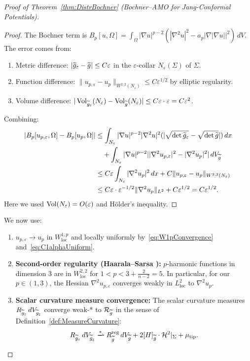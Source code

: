 \begin{proof}[Proof of Theorem~\ref{thm:DistrBochner} (Bochner--AMO for Jang-Conformal Potentials)]
\begin{proof}
The Bochner term is $B_p[u,\Omega] = \int_\Omega |\nabla u|^{p-2}(|\nabla^2 u|^2 - a_p|\nabla|\nabla u||^2) \, dV$. The error comes from:
\begin{enumerate}
    \item Metric difference: $|\widetilde{g}_\varepsilon - \widetilde{g}| \le C\varepsilon$ in the $\varepsilon$-collar $N_\varepsilon(\Sigma)$ of $\Sigma$.
    \item Function difference: $\|u_{p,\varepsilon} - u_p\|_{W^{2,2}(N_\varepsilon)} \le C\varepsilon^{1/2}$ by elliptic regularity.
    \item Volume difference: $|\operatorname{Vol}_{\widetilde{g}_\varepsilon}(N_\varepsilon) - \operatorname{Vol}_{\widetilde{g}}(N_\varepsilon)| \le C\varepsilon \cdot \varepsilon = C\varepsilon^2$.
\end{enumerate}
Combining:
\begin{align}
    |B_p[u_{p,\varepsilon}, \Omega] - B_p[u_p, \Omega]| &\le \int_{N_\varepsilon} |\nabla u|^{p-2} |\nabla^2 u|^2 (|\sqrt{\det\widetilde{g}_\varepsilon} - \sqrt{\det\widetilde{g}}|) \, dx \\
    &\quad + \int_{N_\varepsilon} |\nabla u|^{p-2} ||\nabla^2 u_{p,\varepsilon}|^2 - |\nabla^2 u_p|^2| \, dV_{\widetilde{g}} \\
    &\le C \varepsilon \int_{N_\varepsilon} |\nabla^2 u_p|^2 \, dx + C\|u_{p,\varepsilon} - u_p\|_{W^{2,2}(N_\varepsilon)} \\
    &\le C\varepsilon \cdot \varepsilon^{-1/2} \|\nabla^2 u_p\|_{L^2} + C\varepsilon^{1/2} = C\varepsilon^{1/2}.
\end{align}
Here we used $\operatorname{Vol}(N_\varepsilon) = O(\varepsilon)$ and H\"older's inequality.
\end{proof}

We now use:
\begin{enumerate}
    \item[(a)] $u_{p,\varepsilon} \to u_p$ in $W^{1,p}_{\mathrm{loc}}$ and locally uniformly by~\eqref{eq:W1pConvergence} and~\eqref{eq:C1alphaUniform}.
    
    \item[(b)] \textbf{Second-order regularity (Haarala--Sarsa \cite{haaralasarsa2022}):} $p$-harmonic functions in dimension 3 are in $W^{2,2}_{\mathrm{loc}}$ for $1 < p < 3 + \frac{2}{n-2} = 5$. In particular, for our $p \in (1, 3)$, the Hessian $\nabla^2 u_{p,\varepsilon}$ converges weakly in $L^2_{\mathrm{loc}}$ to $\nabla^2 u_p$.
    
    \item[(c)] \textbf{Scalar curvature measure convergence:} The scalar curvature measures $R_{\widetilde{g}_\varepsilon} \, dV_{\widetilde{g}_\varepsilon}$ converge weak-* to $\mathcal{R}_{\widetilde{g}}$ in the sense of Definition~\ref{def:MeasureCurvature}:
    \begin{equation}
        R_{\tg_\varepsilon} \, dV_{\tg_\varepsilon} \xrightharpoonup{*} R_{\tg}^{\mathrm{reg}} \, dV_{\tg} + 2[H]_{\tg} \cdot \mathcal{H}^2|_\Sigma + \mu_{\mathrm{tip}}.
    \end{equation}
    

\end{enumerate}
\end{proof}
